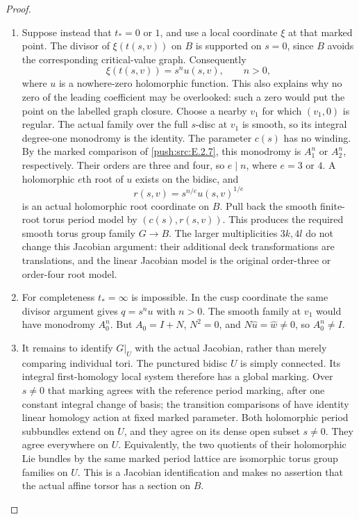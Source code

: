 \begin{proof}
\begin{enumerate}[label={$\langle1\rangle$\arabic*.},leftmargin=*]
\item Suppose instead that $t_*=0$ or $1$, and use a local
coordinate $\xi$ at that marked point.  The divisor of
$\xi(t(s,v))$ on $B$ is supported on $s=0$, since $B$
avoids the corresponding critical-value graph.
Consequently
\[
 \xi(t(s,v))=s^n u(s,v),\qquad n>0,
\]
where $u$ is a nowhere-zero holomorphic function.
This also explains why no zero of the leading
coefficient may be overlooked: such a zero would put
the point on the labelled graph closure.
Choose a nearby $v_1$ for which $(v_1,0)$ is regular.
The actual family over the full $s$-disc at $v_1$ is
smooth, so its integral degree-one monodromy is the
identity.  The parameter $c(s)$ has no winding.  By
the marked comparison of \ref{push:src:E.2.7}, this monodromy is
$A_1^n$ or $A_2^n$, respectively.  Their orders are
three and four, so $e\mid n$, where $e=3$ or $4$.
A holomorphic $e$th root of $u$ exists on the bidisc,
and
\[
 r(s,v)=s^{n/e}u(s,v)^{1/e}
\]
is an actual holomorphic root coordinate on $B$.
Pull back the smooth finite-root torus period model
by $(c(s),r(s,v))$.  This produces the required
smooth torus group family $G\to B$.  The larger
multiplicities $3k,4l$ do not change this Jacobian
argument: their additional deck transformations
are translations, and the linear Jacobian model
is the original order-three or order-four root model.

\item For completeness $t_*=\infty$ is impossible.  In the
cusp coordinate the same divisor argument gives
$q=s^n u$ with $n>0$.  The smooth family at $v_1$
would have monodromy $A_0^n$.  But
$A_0=I+N$, $N^2=0$, and
$N\widehat u=\widehat w\ne0$, so $A_0^n\ne I$.

\item It remains to identify $G|_U$ with the actual Jacobian,
rather than merely comparing individual tori.
The punctured bidisc $U$ is simply connected.  Its
integral first-homology local system therefore has
a global marking.  Over $s\ne0$ that marking agrees
with the reference period marking, after one constant
integral change of basis; the transition comparisons
of  have identity linear homology action at
fixed marked parameter.  Both holomorphic period
subbundles extend on $U$, and they agree on its dense
open subset $s\ne0$.  They agree everywhere on $U$.
Equivalently, the two quotients of their holomorphic
Lie bundles by the same marked period lattice are
isomorphic torus group families on $U$.  This is a
Jacobian identification and makes no assertion that
the actual affine torsor has a section on $B$.


\end{enumerate}
\end{proof}

